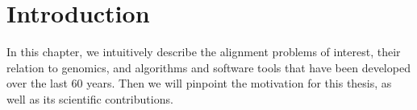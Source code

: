 \graphicspath{{\dir/}}


\chapter*{Introduction} \label{ch:introduction}

In this chapter, we intuitively describe the alignment problems of interest,
their relation to genomics, and algorithms and software tools that have been
developed over the last 60 years. Then we will pinpoint the motivation for this
thesis, as well as its scientific contributions.





